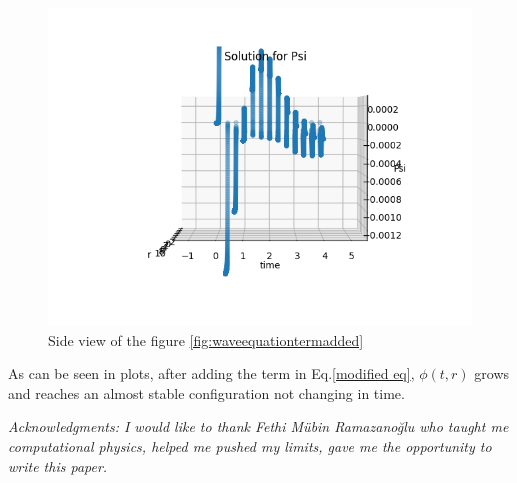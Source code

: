 \documentclass[aps,twocolumn,showpacs,preprintnumbers,nofootinbib,prl,superscriptaddress,groupedaddress]{revtex4-1}
\begin{document}
\begin{figure}
	\centering
	\includegraphics[width=1\linewidth]{Figures/Beyond_Einstein_Figures/wave_equation_termadded2}
	\caption{Side view of the figure \ref{fig:waveequationtermadded}}
	\label{fig:waveequationtermadded2}
\end{figure}
 As can be seen in plots, after adding the term in Eq.\ref{modified eq}, $\phi(t,r)$ grows and reaches an almost stable configuration not changing in time.

\textit{Acknowledgments: I would like to thank Fethi M\"{u}bin Ramazano\u{g}lu who taught me computational physics, helped me pushed my limits, gave me the opportunity to write this paper.  }
\end{document}
